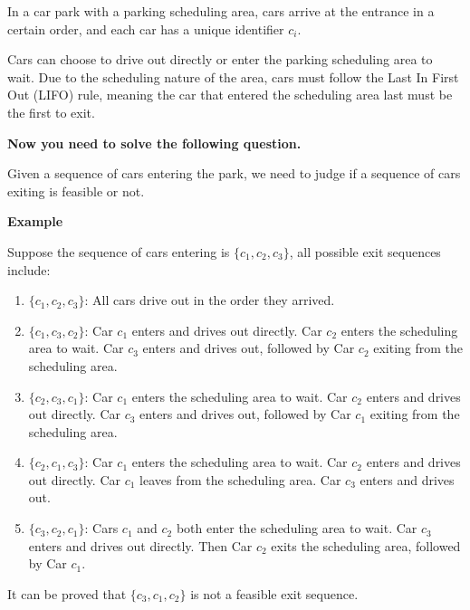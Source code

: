 
In a car park with a parking scheduling area, cars arrive at the entrance in a certain order, and each car has a unique identifier $c_i$.

Cars can choose to drive out directly or enter the parking scheduling area to wait. Due to the scheduling nature of the area, cars must follow the Last In First Out (LIFO) rule, meaning the car that entered the scheduling area last must be the first to exit.

\textbf{Now you need to solve the following question.}

Given a sequence of cars entering the park, we need to judge if a sequence of cars exiting is feasible or not.

\textbf{Example}

Suppose the sequence of cars entering is $ \{c_1, c_2, c_3\} $, all possible exit sequences include:

\begin{enumerate}
    \item $ \{c_1, c_2, c_3\} $: All cars drive out in the order they arrived.

    \item $ \{c_1, c_3, c_2 \} $: Car $ c_1 $ enters and drives out directly. Car $ c_2 $ enters the scheduling area to wait. Car $ c_3 $ enters and drives out, followed by Car $ c_2 $ exiting from the scheduling area.

    \item $ \{c_2, c_3, c_1\} $: Car $ c_1 $ enters the scheduling area to wait. Car $ c_2 $ enters and drives out directly. Car $ c_3 $ enters and drives out, followed by Car $ c_1 $ exiting from the scheduling area.

    \item $ \{c_2, c_1, c_3\} $: Car $ c_1 $ enters the scheduling area to wait. Car $ c_2 $ enters and drives out directly. Car $ c_1 $ leaves from the scheduling area. Car $ c_3 $ enters and drives out.

    \item $ \{ c_3, c_2, c_1 \} $: Cars $ c_1 $ and $ c_2 $ both enter the scheduling area to wait. Car $ c_3 $ enters and drives out directly. Then Car $ c_2 $ exits the scheduling area, followed by Car $ c_1 $.
\end{enumerate}

It can be proved that $\{c_3, c_1, c_2\}$ is not a feasible exit sequence.
\linespread{1}

